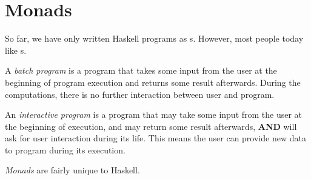 \section{Monads}\label{sec:Monads}
So far, we have only written Haskell programs as s.
However, most people today like s.

\begin{definition}\label{def:Batch_Program}
  A \emph{batch program} is a program that takes some input from the user at the beginning of program execution and returns some result afterwards.
  During the computations, there is no further interaction between user and program.
\end{definition}

\begin{definition}\label{def:Interactive_Program}
  An \emph{interactive program} is a program that may take some input from the user at the beginning of execution, and may return some result afterwards, \textbf{AND} will ask for user interaction during its life.
  This means the user can provide new data to program during its execution.
\end{definition}

\begin{definition}[Monad]\label{def:Monad}
  \emph{Monads} are fairly unique to Haskell.
\end{definition}

